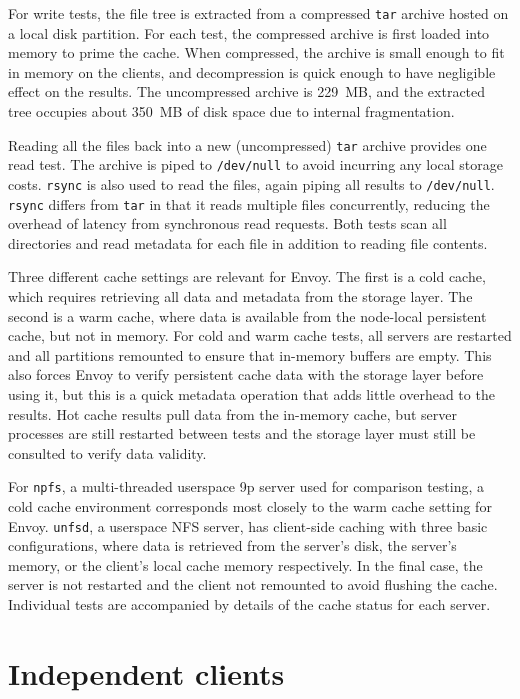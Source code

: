 For write tests, the file tree is extracted from a compressed \texttt{tar} archive hosted on a local disk partition. For each test, the compressed archive is first loaded into memory to prime the cache. When compressed, the archive is small enough to fit in memory on the clients, and decompression is quick enough to have negligible effect on the results. The uncompressed archive is 229~MB, and the extracted tree occupies about 350~MB of disk space due to internal fragmentation.

Reading all the files back into a new (uncompressed) \texttt{tar} archive provides one read test. The archive is piped to \texttt{/dev/null} to avoid incurring any local storage costs. \texttt{rsync} is also used to read the files, again piping all results to \texttt{/dev/null}. \texttt{rsync} differs from \texttt{tar} in that it reads multiple files concurrently, reducing the overhead of latency from synchronous read requests. Both tests scan all directories and read metadata for each file in addition to reading file contents.

Three different cache settings are relevant for Envoy. The first is a cold cache, which requires retrieving all data and metadata from the storage layer. The second is a warm cache, where data is available from the node-local persistent cache, but not in memory. For cold and warm cache tests, all servers are restarted and all partitions remounted to ensure that in-memory buffers are empty. This also forces Envoy to verify persistent cache data with the storage layer before using it, but this is a quick metadata operation that adds little overhead to the results. Hot cache results pull data from the in-memory cache, but server processes are still restarted between tests and the storage layer must still be consulted to verify data validity.

For \texttt{npfs}, a multi-threaded userspace 9p server used for comparison testing, a cold cache environment corresponds most closely to the warm cache setting for Envoy. \texttt{unfsd}, a userspace NFS server, has client-side caching with three basic configurations, where data is retrieved from the server's disk, the server's memory, or the client's local cache memory respectively. In the final case, the server is not restarted and the client not remounted to avoid flushing the cache. Individual tests are accompanied by details of the cache status for each server.

\section{Independent clients}\label{sec:independent-clients}

